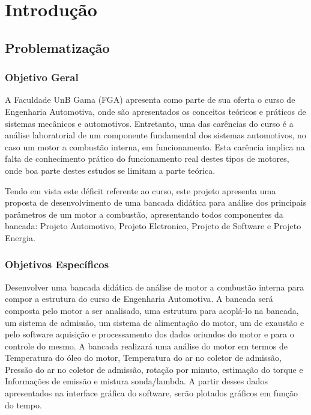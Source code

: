 \chapter*[Introdução]{Introdução}

\section{Problematização}

\subsection{Objetivo Geral}

A Faculdade UnB Gama (FGA) apresenta como parte de sua oferta o curso de Engenharia Automotiva, onde são apresentados os conceitos teóricos e práticos de sistemas mecânicos e automotivos. Entretanto, uma das carências do curso é a análise laboratorial de um componente fundamental dos sistemas automotivos, no caso um motor a combustão interna, em funcionamento. Esta carência implica na falta de conhecimento prático do funcionamento real destes tipos de motores, onde boa parte destes estudos se limitam a parte teórica.

Tendo em vista este déficit referente ao curso, este projeto apresenta uma proposta de desenvolvimento de uma bancada didática para análise dos principais parâmetros de um motor a combustão, apresentando todos componentes da bancada: Projeto Automotivo, Projeto Eletronico, Projeto de Software e Projeto Energia.

\subsection{Objetivos Específicos}

Desenvolver uma bancada didática de análise de motor a combustão interna para compor a estrutura do curso de Engenharia Automotiva. A bancada será composta pelo motor a ser analisado, uma estrutura para acoplá-lo na bancada, um sistema de admissão, um sistema de alimentação do motor, um de exaustão e pelo software aquisição e processamento dos dados oriundos do motor e para o controle do mesmo. A bancada realizará uma análise do motor em termos de Temperatura do óleo do motor, Temperatura do ar no coletor de admissão, Pressão do ar no coletor de admissão, rotação por minuto, estimação do torque e Informações de emissão e mistura sonda/lambda. A partir desses dados apresentados na interface gráfica do software, serão plotados gráficos em função do tempo.

